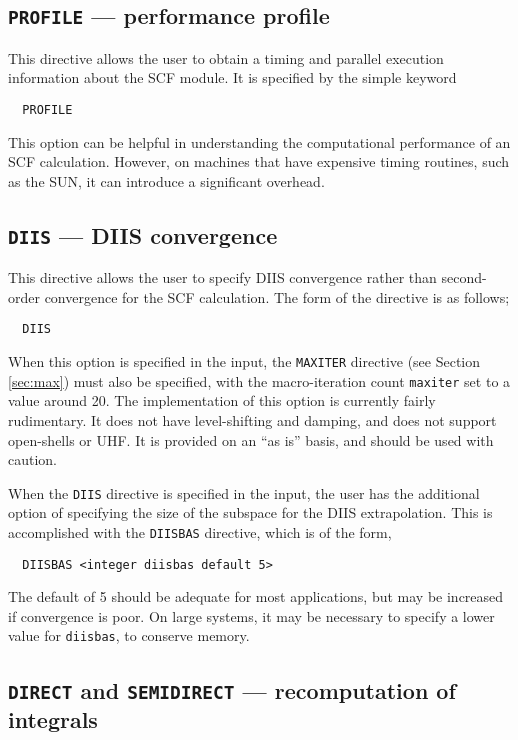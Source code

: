 \subsection{{\tt PROFILE} --- performance profile}

This directive allows the user to obtain a timing and parallel
execution information about the SCF module.  It is specified by the
simple keyword

\begin{verbatim}
  PROFILE
\end{verbatim}

This option can be helpful in understanding the computational
performance of an SCF calculation.  However, on machines that have
expensive timing routines, such as the SUN, it can introduce a
significant overhead.

\subsection{{\tt DIIS} --- DIIS convergence}

This directive allows the user to specify DIIS convergence rather than
second-order convergence for the SCF calculation.  The form of the
directive is as follows;

\begin{verbatim}
  DIIS
\end{verbatim}

When this option is specified in the input, the \verb+MAXITER+
directive (see Section \ref{sec:max}) must also be specified, with the
macro-iteration count \verb+maxiter+ set to a value around 20.  The
implementation of this option is currently fairly rudimentary.  It
does not have level-shifting and damping, and does not support
open-shells or UHF.  It is provided on an ``as is'' basis, and should
be used with caution.

When the \verb+DIIS+ directive is specified in the input, the user has
the additional option of specifying the size of the subspace for the DIIS
extrapolation.  This is accomplished with the \verb+DIISBAS+ directive,
which is of the form,
\begin{verbatim}
  DIISBAS <integer diisbas default 5>
\end{verbatim}
The default of 5 should be adequate for most applications, but may be
increased if convergence is poor.  On large systems, it may be necessary
to specify a lower value for \verb+diisbas+, to conserve memory.

\subsection{{\tt DIRECT} and {\tt SEMIDIRECT} --- recomputation of integrals}
\label{sec:semidirect}

